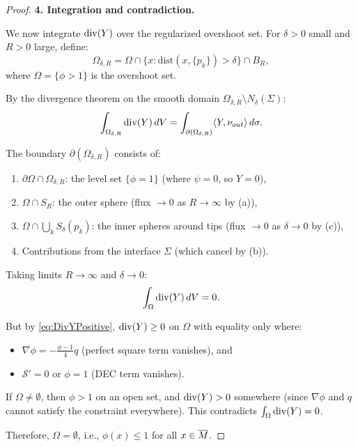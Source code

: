 \begin{proof}
\textbf{4. Integration and contradiction.}

We now integrate $\mathrm{div}(Y)$ over the regularized overshoot set. For $\delta > 0$ small and $R > 0$ large, define:
\begin{equation}
    \Omega_{\delta, R} = \Omega \cap \{x : \text{dist}(x, \{p_k\}) > \delta\} \cap B_R,
\end{equation}
where $\Omega = \{\phi > 1\}$ is the overshoot set.

By the divergence theorem on the smooth domain $\Omega_{\delta, R} \setminus N_\delta(\Sigma)$:
\begin{equation}
    \int_{\Omega_{\delta, R}} \mathrm{div}(Y) \, dV = \int_{\partial(\Omega_{\delta, R})} \langle Y, \nu_{out} \rangle \, d\sigma.
\end{equation}

The boundary $\partial(\Omega_{\delta, R})$ consists of:
\begin{enumerate}
    \item $\partial\Omega \cap \Omega_{\delta, R}$: the level set $\{\phi = 1\}$ (where $\psi = 0$, so $Y = 0$),
    \item $\Omega \cap S_R$: the outer sphere (flux $\to 0$ as $R \to \infty$ by (a)),
    \item $\Omega \cap \bigcup_k S_\delta(p_k)$: the inner spheres around tips (flux $\to 0$ as $\delta \to 0$ by (c)),
    \item Contributions from the interface $\Sigma$ (which cancel by (b)).
\end{enumerate}

Taking limits $R \to \infty$ and $\delta \to 0$:
\begin{equation}
    \int_{\Omega} \mathrm{div}(Y) \, dV = 0.
\end{equation}

But by \eqref{eq:DivYPositive}, $\mathrm{div}(Y) \ge 0$ on $\Omega$ with equality only where:
\begin{itemize}
    \item $\nabla\phi = -\frac{\phi-1}{4}q$ (perfect square term vanishes), and
    \item $\mathcal{S}' = 0$ or $\phi = 1$ (DEC term vanishes).
\end{itemize}

If $\Omega \ne \emptyset$, then $\phi > 1$ on an open set, and $\mathrm{div}(Y) > 0$ somewhere (since $\nabla\phi$ and $q$ cannot satisfy the constraint everywhere). This contradicts $\int_\Omega \mathrm{div}(Y) = 0$.

Therefore, $\Omega = \emptyset$, i.e., $\phi(x) \le 1$ for all $x \in \overline{M}$.
\end{proof}

